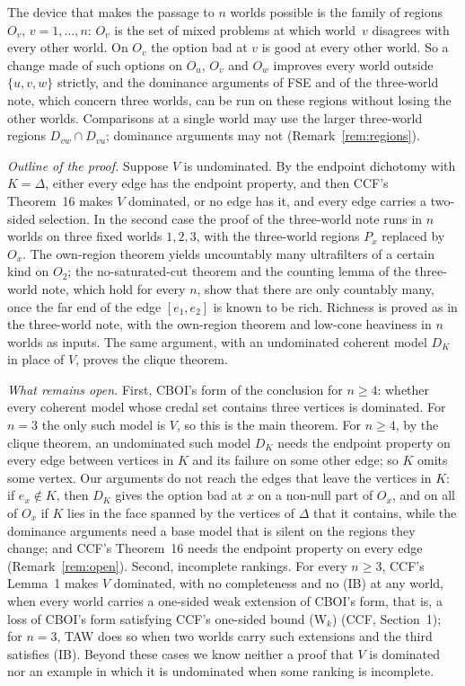 \documentclass[11pt]{article}
\theoremstyle{definition}\newtheorem{definition}[theorem]{Definition}
\theoremstyle{remark}\newtheorem{remark}[theorem]{Remark}
\begin{document}
The device that makes the passage to $n$ worlds possible is the family of
regions $O_v$, $v=1,\dots,n$: $O_v$ is the set of mixed problems at which
world~$v$ disagrees with every other world. On $O_v$ the option bad at $v$
is good at every other world. So a change made of such options on $O_u$,
$O_v$ and $O_w$ improves every world outside $\{u,v,w\}$ strictly, and the
dominance arguments of FSE and of the three-world note, which concern
three worlds, can be run on these regions without losing the other worlds.
Comparisons at a single world may use the larger three-world regions
$D_{vw}\cap D_{vu}$; dominance arguments may not (Remark~\ref{rem:regions}).

\emph{Outline of the proof.} Suppose $V$ is undominated. By the endpoint
dichotomy with $K=\Delta$, either every edge has the endpoint property, and
then CCF's Theorem~16 makes $V$ dominated, or no edge has it, and every
edge carries a two-sided selection. In the second case the proof of the
three-world note runs in $n$ worlds on three fixed worlds $1,2,3$, with the
three-world regions $P_x$ replaced by $O_x$. The own-region theorem yields
uncountably many ultrafilters of a certain kind on $O_2$; the
no-saturated-cut theorem and the counting lemma of the three-world note,
which hold for every $n$, show that there are only countably many, once
the far end of the edge $[e_1,e_2]$ is known to be rich. Richness is proved
as in the three-world note, with the own-region theorem and low-cone
heaviness in $n$ worlds as inputs. The same argument, with an undominated
coherent model $D_K$ in place of $V$, proves the clique theorem.

\emph{What remains open.} First, CBOI's form of the conclusion for
$n\ge4$: whether every coherent model whose credal set contains three
vertices is dominated. For $n=3$ the only such model is $V$, so this is the
main theorem. For $n\ge4$, by the clique theorem, an undominated such model
$D_K$ needs the endpoint property on every edge between vertices in $K$ and
its failure on some other edge; so $K$ omits some vertex. Our arguments do
not reach the edges that leave the vertices in $K$: if $e_x\notin K$, then
$D_K$ gives the option bad at $x$ on a non-null part of $O_x$, and on all
of $O_x$ if $K$ lies in the face spanned by the vertices of $\Delta$ that it
contains, while the dominance arguments need a base model that is silent
on the regions they change; and CCF's Theorem~16 needs the endpoint
property on every edge (Remark~\ref{rem:open}). Second, incomplete
rankings. For every $n\ge3$, CCF's Lemma~1 makes $V$ dominated, with no
completeness and no (IB) at any world, when every world carries a
one-sided weak extension of CBOI's form, that is, a loss of CBOI's form
satisfying CCF's one-sided bound (W$_k$) (CCF, Section~1); for $n=3$, TAW
does so when two worlds carry such extensions and the third satisfies
(IB). Beyond these cases we know
neither a proof that $V$ is dominated nor an example in which it is
undominated when some ranking is incomplete.
\end{document}
